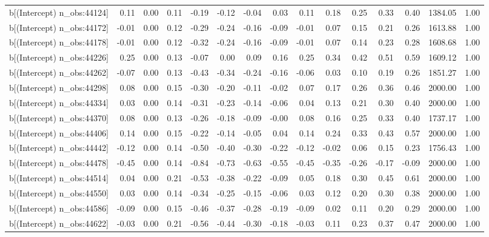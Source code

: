 \begin{table}[ht]
\begin{tabular}{rrrrrrrrrrrrrrr}
  b[(Intercept) n\_obs:44124] & 0.11 & 0.00 & 0.11 & -0.19 & -0.12 & -0.04 & 0.03 & 0.11 & 0.18 & 0.25 & 0.33 & 0.40 & 1384.05 & 1.00 \\ 
  b[(Intercept) n\_obs:44172] & -0.01 & 0.00 & 0.12 & -0.29 & -0.24 & -0.16 & -0.09 & -0.01 & 0.07 & 0.15 & 0.21 & 0.26 & 1613.88 & 1.00 \\ 
  b[(Intercept) n\_obs:44178] & -0.01 & 0.00 & 0.12 & -0.32 & -0.24 & -0.16 & -0.09 & -0.01 & 0.07 & 0.14 & 0.23 & 0.28 & 1608.68 & 1.00 \\ 
  b[(Intercept) n\_obs:44226] & 0.25 & 0.00 & 0.13 & -0.07 & 0.00 & 0.09 & 0.16 & 0.25 & 0.34 & 0.42 & 0.51 & 0.59 & 1609.12 & 1.00 \\ 
  b[(Intercept) n\_obs:44262] & -0.07 & 0.00 & 0.13 & -0.43 & -0.34 & -0.24 & -0.16 & -0.06 & 0.03 & 0.10 & 0.19 & 0.26 & 1851.27 & 1.00 \\ 
  b[(Intercept) n\_obs:44298] & 0.08 & 0.00 & 0.15 & -0.30 & -0.20 & -0.11 & -0.02 & 0.07 & 0.17 & 0.26 & 0.36 & 0.46 & 2000.00 & 1.00 \\ 
  b[(Intercept) n\_obs:44334] & 0.03 & 0.00 & 0.14 & -0.31 & -0.23 & -0.14 & -0.06 & 0.04 & 0.13 & 0.21 & 0.30 & 0.40 & 2000.00 & 1.00 \\ 
  b[(Intercept) n\_obs:44370] & 0.08 & 0.00 & 0.13 & -0.26 & -0.18 & -0.09 & -0.00 & 0.08 & 0.16 & 0.25 & 0.33 & 0.40 & 1737.17 & 1.00 \\ 
  b[(Intercept) n\_obs:44406] & 0.14 & 0.00 & 0.15 & -0.22 & -0.14 & -0.05 & 0.04 & 0.14 & 0.24 & 0.33 & 0.43 & 0.57 & 2000.00 & 1.00 \\ 
  b[(Intercept) n\_obs:44442] & -0.12 & 0.00 & 0.14 & -0.50 & -0.40 & -0.30 & -0.22 & -0.12 & -0.02 & 0.06 & 0.15 & 0.23 & 1756.43 & 1.00 \\ 
  b[(Intercept) n\_obs:44478] & -0.45 & 0.00 & 0.14 & -0.84 & -0.73 & -0.63 & -0.55 & -0.45 & -0.35 & -0.26 & -0.17 & -0.09 & 2000.00 & 1.00 \\ 
  b[(Intercept) n\_obs:44514] & 0.04 & 0.00 & 0.21 & -0.53 & -0.38 & -0.22 & -0.09 & 0.05 & 0.18 & 0.30 & 0.45 & 0.61 & 2000.00 & 1.00 \\ 
  b[(Intercept) n\_obs:44550] & 0.03 & 0.00 & 0.14 & -0.34 & -0.25 & -0.15 & -0.06 & 0.03 & 0.12 & 0.20 & 0.30 & 0.38 & 2000.00 & 1.00 \\ 
  b[(Intercept) n\_obs:44586] & -0.09 & 0.00 & 0.15 & -0.46 & -0.37 & -0.28 & -0.19 & -0.09 & 0.02 & 0.11 & 0.20 & 0.29 & 2000.00 & 1.00 \\ 
  b[(Intercept) n\_obs:44622] & -0.03 & 0.00 & 0.21 & -0.56 & -0.44 & -0.30 & -0.18 & -0.03 & 0.11 & 0.23 & 0.37 & 0.47 & 2000.00 & 1.00 \\ 

\end{tabular}
\end{table}
